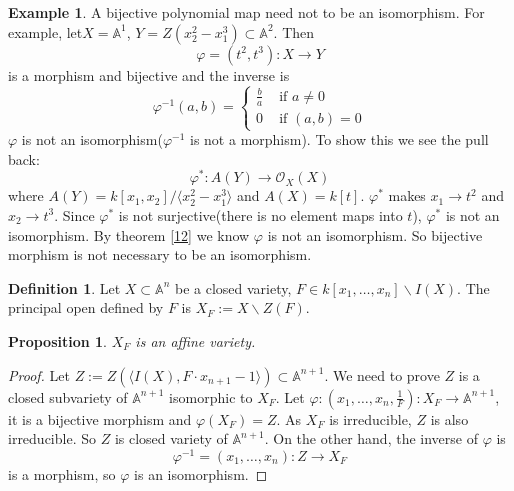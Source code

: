 \documentclass{amsart}
\theoremstyle{plain}
\newtheorem{proposition}{Proposition}
\theoremstyle{definition}
\newtheorem{definition}{Definition}
\newtheorem{example}{Example}
\theoremstyle{remark}
\numberwithin{equation}{section}
\begin{document}
\begin{example}
	A bijective polynomial map need not to be an isomorphism. For example, let$ X=\mathbb{A}^1 $, $ Y=Z(x_2^2-x_1^3) \subset \mathbb{A}^2 $. Then
	$$
	\varphi=(t^2,t^3):X\to Y
	$$
	is a morphism and bijective and the inverse is
	$$
	\varphi^{-1}(a,b)=\left\lbrace \begin{matrix}
	\frac{b}{a} & \text{ if } a\neq 0\\
	0 & \text{ if } (a,b)=0
	\end{matrix}\right.
	$$
	$ \varphi $ is not an isomorphism($ \varphi^{-1} $ is not a morphism). To show this we see the pull back:
	$$
	\varphi^\ast : A(Y)\to \mathcal{O}_X(X)
	$$
	where $ A(Y)=k[x_1,x_2]/\langle x_2^2-x_1^3\rangle $ and $ A(X)=k[t] $. $ \varphi^\ast $ makes $ x_1\to t^2 $ and $ x_2\to t^3 $. Since $ \varphi^\ast $ is not surjective(there is no element maps into $ t $), $ \varphi^\ast $ is not an isomorphism. By theorem \ref{12} we know $ \varphi $ is not an isomorphism. So bijective morphism is not necessary to be an isomorphism.
\end{example}
\begin{definition}
	Let $ X\subset \mathbb{A}^n $ be a closed variety, $ F\in k[x_1,\dots,x_n]\backslash I(X) $. The principal open defined by $ F $ is $ X_F:=X\backslash Z(F) $.
\end{definition}
\begin{proposition}\label{14}
	$ X_F $ is an affine variety.
\end{proposition}
\begin{proof}
	Let $ Z:=Z(\langle I(X),F\cdot x_{n+1}-1\rangle )\subset \mathbb{A}^{n+1} $. We need to prove $ Z $ is a closed subvariety of $ \mathbb{A}^{n+1} $ isomorphic to $ X_F $. Let $ \varphi:(x_1,\dots,x_n,\frac{1}{F}):X_F\to \mathbb{A}^{n+1} $, it is a bijective morphism and $ \varphi(X_F)=Z $. As $ X_F $ is irreducible, $ Z $ is also irreducible. So $ Z $ is closed variety of $ \mathbb{A}^{n+1} $. On the other hand, the inverse of $ \varphi $ is
	$$
	\varphi^{-1}=(x_1,\dots,x_n):Z\to X_F
	$$
	is a morphism, so $ \varphi $ is an isomorphism.
\end{proof}
\end{document}

